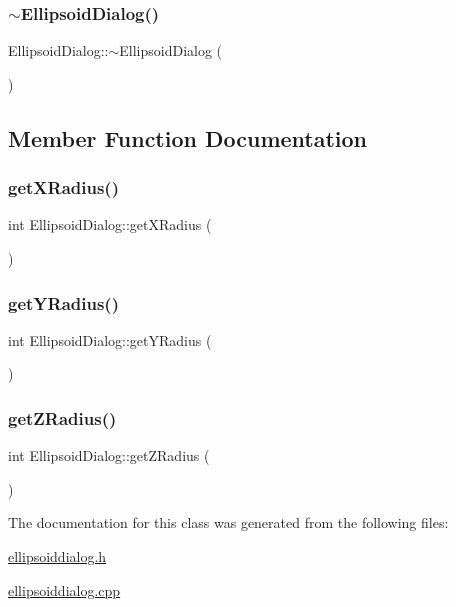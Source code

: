 \subsubsection{\texorpdfstring{$\sim$\+Ellipsoid\+Dialog()}{~EllipsoidDialog()}}
{\footnotesize\ttfamily Ellipsoid\+Dialog\+::$\sim$\+Ellipsoid\+Dialog (\begin{DoxyParamCaption}{ }\end{DoxyParamCaption})}



\subsection{Member Function Documentation}
\mbox{\label{class_ellipsoid_dialog_aa92ffaab15db5c6efad8716d1d847942}} 
\subsubsection{\texorpdfstring{get\+X\+Radius()}{getXRadius()}}
{\footnotesize\ttfamily int Ellipsoid\+Dialog\+::get\+X\+Radius (\begin{DoxyParamCaption}{ }\end{DoxyParamCaption})}

\mbox{\label{class_ellipsoid_dialog_ab9853e51e07c2378aa2464c7be0b9ea2}} 
\subsubsection{\texorpdfstring{get\+Y\+Radius()}{getYRadius()}}
{\footnotesize\ttfamily int Ellipsoid\+Dialog\+::get\+Y\+Radius (\begin{DoxyParamCaption}{ }\end{DoxyParamCaption})}

\mbox{\label{class_ellipsoid_dialog_ae1cd5fe8262f49b4f158a508fc415ee7}} 
\subsubsection{\texorpdfstring{get\+Z\+Radius()}{getZRadius()}}
{\footnotesize\ttfamily int Ellipsoid\+Dialog\+::get\+Z\+Radius (\begin{DoxyParamCaption}{ }\end{DoxyParamCaption})}



The documentation for this class was generated from the following files\+:\begin{DoxyCompactItemize}
\item 
\hyperlink{ellipsoiddialog_8h}{ellipsoiddialog.\+h}\item 
\hyperlink{ellipsoiddialog_8cpp}{ellipsoiddialog.\+cpp}\end{DoxyCompactItemize}
